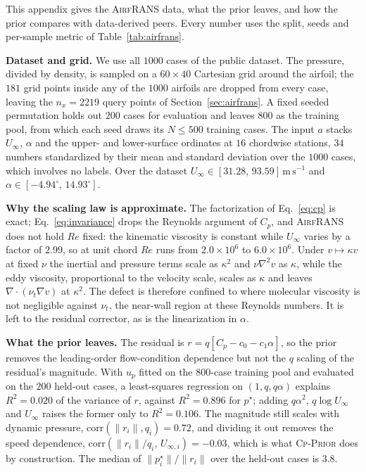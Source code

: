 \documentclass{article}
\begin{document}
This appendix gives the \textsc{AirfRANS} data, what the prior leaves, and how the
prior compares with data-derived peers. Every number uses the split, seeds and
per-sample metric of Table~\ref{tab:airfrans}.

\textbf{Dataset and grid.} We use all $1000$ cases of the public dataset. The
pressure, divided by density, is sampled on a $60\times40$ Cartesian grid around the
airfoil; the $181$ grid points inside any of the $1000$ airfoils are dropped from every
case, leaving the $n_x=2219$ query points of Section~\ref{sec:airfrans}. A fixed
seeded permutation holds out $200$ cases for evaluation and leaves $800$ as the
training pool, from which each seed draws its $N\le500$ training cases. The input $a$
stacks $U_\infty$, $\alpha$ and the upper- and lower-surface ordinates at $16$
chordwise stations, $34$ numbers standardized by their mean and standard deviation over
the $1000$ cases, which involves no labels. Over the dataset
$U_\infty\in[31.28,\,93.59]\,\mathrm{m\,s^{-1}}$ and
$\alpha\in[-4.94^\circ,\,14.93^\circ]$.

\textbf{Why the scaling law is approximate.} The factorization of Eq.~\ref{eq:cp} is
exact; Eq.~\ref{eq:invariance} drops the Reynolds argument of $C_p$, and
\textsc{AirfRANS} does not hold $Re$ fixed: the kinematic viscosity is constant while
$U_\infty$ varies by a factor of $2.99$, so at unit chord $Re$ runs from
$2.0\times10^{6}$ to $6.0\times10^{6}$. Under \(v \mapsto \kappa v\) at fixed $\nu$ the
inertial and pressure terms scale as \(\kappa^{2}\) and \(\nu\nabla^{2} v\) as
\(\kappa\), while the eddy viscosity, proportional to the velocity scale, scales as
\(\kappa\) and leaves $\nabla\!\cdot\!(\nu_t\nabla v)$ at \(\kappa^{2}\). The defect is
therefore confined to where molecular viscosity is not negligible against $\nu_t$, the
near-wall region at these Reynolds numbers. It is left to the residual corrector, as is
the linearization in $\alpha$.

\textbf{What the prior leaves.} The residual is $r = q[C_p - c_0 - c_1\alpha]$, so the
prior removes the leading-order flow-condition dependence but not the $q$ scaling of
the residual's magnitude. With $u_p$ fitted on the $800$-case training pool and
evaluated on the $200$ held-out cases, a least-squares regression on $(1,q,q\alpha)$
explains $R^{2}=0.020$ of the variance of $r$, against $R^{2}=0.896$ for $p^\star$;
adding $q\alpha^{2}$, $q\log U_\infty$ and $U_\infty$ raises the former only to
$R^{2}=0.106$. The magnitude still scales with dynamic pressure,
$\mathrm{corr}(\|r_i\|, q_i)=0.72$, and dividing it out removes the speed dependence,
$\mathrm{corr}(\|r_i\|/q_i,\, U_{\infty,i})=-0.03$, which is what \textsc{Cp-Prior}
does by construction. The median of $\|p^\star_i\|/\|r_i\|$ over the held-out cases is
$3.8$.
\end{document}
